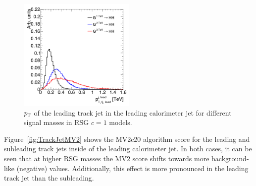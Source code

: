 \begin{figure}[t!]
  \centering
  \captionsetup{justification=centering}

  \includegraphics[width=0.5\textwidth]{figures/TrackJetPt}
  \caption{$p_{\textrm{\footnotesize\sc t}}$ of the leading track jet in the leading calorimeter jet for different signal masses in RSG $c=1$ models.}
  \label{fig:TrackJetPt}
\end{figure}

Figure~\ref{fig:TrackJetMV2} shows the MV2c20 algorithm score for the leading and subleading track jets inside of the leading calorimeter jet. In both cases, it can be seen that at higher RSG masses the MV2 score shifts towards more background-like (negative) values. Additionally, this effect is more pronounced in the leading track jet than the subleading. 


